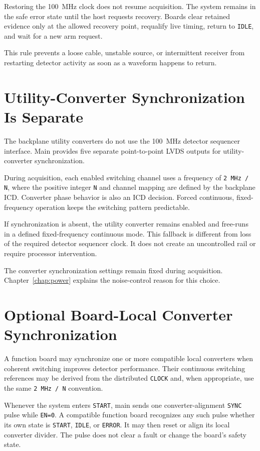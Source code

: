 Restoring the 100~MHz clock does not resume acquisition. The system remains in the safe error state until the host requests recovery. Boards clear retained evidence only at the allowed recovery point, requalify live timing, return to \texttt{IDLE}, and wait for a new arm request.

This rule prevents a loose cable, unstable source, or intermittent receiver from restarting detector activity as soon as a waveform happens to return.

\section{Utility-Converter Synchronization Is Separate}

The backplane utility converters do not use the 100~MHz detector sequencer interface. Main provides five separate point-to-point LVDS outputs for utility-converter synchronization.

During acquisition, each enabled switching channel uses a frequency of \texttt{2 MHz / N}, where the positive integer \texttt{N} and channel mapping are defined by the backplane ICD. Converter phase behavior is also an ICD decision. Forced continuous, fixed-frequency operation keeps the switching pattern predictable.

If synchronization is absent, the utility converter remains enabled and free-runs in a defined fixed-frequency continuous mode. This fallback is different from loss of the required detector sequencer clock. It does not create an uncontrolled rail or require processor intervention.

The converter synchronization settings remain fixed during acquisition. Chapter~\ref{chap:power} explains the noise-control reason for this choice.

\section{Optional Board-Local Converter Synchronization}

A function board may synchronize one or more compatible local converters when coherent switching improves detector performance. Their continuous switching references may be derived from the distributed \texttt{CLOCK} and, when appropriate, use the same \texttt{2 MHz / N} convention.

Whenever the system enters \texttt{START}, main sends one converter-alignment \texttt{SYNC} pulse while \texttt{EN=0}. A compatible function board recognizes any such pulse whether its own state is \texttt{START}, \texttt{IDLE}, or \texttt{ERROR}. It may then reset or align its local converter divider. The pulse does not clear a fault or change the board's safety state.

